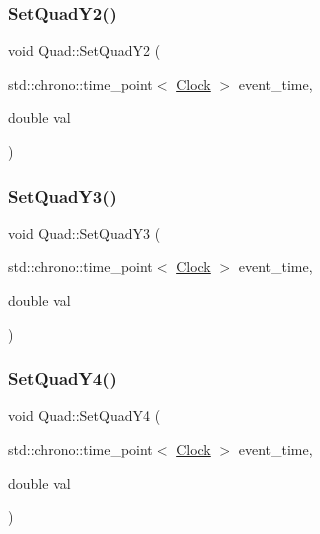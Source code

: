 \mbox{\label{classQuad_afcec579c40a3763c34d1ace417888bf9}} 
\subsubsection{\texorpdfstring{Set\+Quad\+Y2()}{SetQuadY2()}}
{\footnotesize\ttfamily void Quad\+::\+Set\+Quad\+Y2 (\begin{DoxyParamCaption}\item[{std\+::chrono\+::time\+\_\+point$<$ \mbox{\hyperlink{universe_8h_a0ef8d951d1ca5ab3cfaf7ab4c7a6fd80}{Clock}} $>$}]{event\+\_\+time,  }\item[{double}]{val }\end{DoxyParamCaption})\hspace{0.3cm}{\ttfamily [inline]}}

\mbox{\label{classQuad_a1774a89a5d668aadf94966867270c0c5}} 
\subsubsection{\texorpdfstring{Set\+Quad\+Y3()}{SetQuadY3()}}
{\footnotesize\ttfamily void Quad\+::\+Set\+Quad\+Y3 (\begin{DoxyParamCaption}\item[{std\+::chrono\+::time\+\_\+point$<$ \mbox{\hyperlink{universe_8h_a0ef8d951d1ca5ab3cfaf7ab4c7a6fd80}{Clock}} $>$}]{event\+\_\+time,  }\item[{double}]{val }\end{DoxyParamCaption})\hspace{0.3cm}{\ttfamily [inline]}}

\mbox{\label{classQuad_ae299f75dcd479f5eb6ba8efed578961b}} 
\subsubsection{\texorpdfstring{Set\+Quad\+Y4()}{SetQuadY4()}}
{\footnotesize\ttfamily void Quad\+::\+Set\+Quad\+Y4 (\begin{DoxyParamCaption}\item[{std\+::chrono\+::time\+\_\+point$<$ \mbox{\hyperlink{universe_8h_a0ef8d951d1ca5ab3cfaf7ab4c7a6fd80}{Clock}} $>$}]{event\+\_\+time,  }\item[{double}]{val }\end{DoxyParamCaption})\hspace{0.3cm}{\ttfamily [inline]}}

